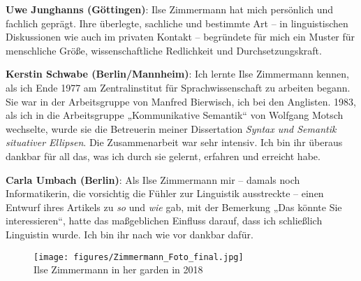 \documentclass[output=paper,colorlinks,citecolor=brown]{langscibook}
\begin{document}
\noindent \textbf{Uwe Junghanns (Göttingen)}: Ilse Zimmermann hat mich persönlich und fachlich geprägt. Ihre überlegte, sachliche und bestimmte Art -- in linguistischen Diskussionen wie auch im privaten Kontakt -- begründete für mich ein Muster für menschliche Größe, wissenschaftliche Redlichkeit und Durchsetzungskraft. \medskip

\noindent \textbf{Kerstin Schwabe (Berlin/Mannheim)}: Ich lernte Ilse Zimmermann kennen, als ich Ende 1977 am Zentralinstitut für Sprachwissenschaft zu arbeiten begann. Sie war in der Arbeitsgruppe von Manfred Bierwisch, ich bei den Anglisten. 1983, als ich in die Arbeitsgruppe „Kommunikative Semantik“ von Wolfgang Motsch wechselte, wurde sie die Betreuerin meiner Dissertation \textit{Syntax und Semantik situativer Ellipsen}. Die Zusammenarbeit war sehr intensiv. Ich bin ihr überaus dankbar für all das, was ich durch sie gelernt, erfahren und erreicht habe. \medskip

\noindent \textbf{Carla Umbach (Berlin)}: Als Ilse Zimmermann mir -- damals noch Informati\-kerin, die vorsichtig die Fühler zur Linguistik ausstreckte -- einen Entwurf ihres Artikels zu \textit{so} und \textit{wie} gab, mit der Bemerkung „Das könnte Sie interessieren“,  hatte das maßgeblichen Einfluss darauf, dass ich schließlich Linguistin wurde. Ich bin ihr nach wie vor dankbar dafür. 

\largerpage
{}
\printbibliography[heading=subbibliography,notkeyword=this,prenote=IntroNote]


\begin{figure}
    \texttt{[image: figures/Zimmermann\_Foto\_final.jpg]}\\

    {\small Ilse Zimmermann in her garden in 2018}%
\end{figure}
\vfill
\pagebreak
\end{document}
